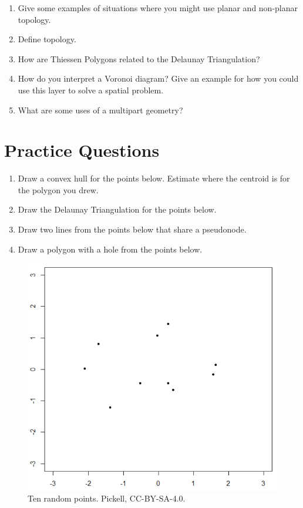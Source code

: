 \documentclass[
]{book}
\providecommand{\tightlist}{%
  \setlength{\itemsep}{0pt}\setlength{\parskip}{0pt}}
\begin{document}
\begin{enumerate}
\def\labelenumi{\arabic{enumi}.}
\tightlist
\item
  Give some examples of situations where you might use planar and non-planar topology.
\item
  Define topology.
\item
  How are Thiessen Polygons related to the Delaunay Triangulation?
\item
  How do you interpret a Voronoi diagram? Give an example for how you could use this layer to solve a spatial problem.
\item
  What are some uses of a multipart geometry?
\end{enumerate}

\section*{Practice Questions}\label{practice-questions-2}

\begin{enumerate}
\def\labelenumi{\arabic{enumi}.}
\tightlist
\item
  Draw a convex hull for the points below. Estimate where the centroid is for the polygon you drew.
\item
  Draw the Delaunay Triangulation for the points below.
\item
  Draw two lines from the points below that share a pseudonode.
\item
  Draw a polygon with a hole from the points below.
\end{enumerate}

\begin{figure}
\includegraphics[width=0.75\linewidth]{images/07-scatterplot} \caption{Ten random points. Pickell, CC-BY-SA-4.0.}\label{fig:7-scatterplot}
\end{figure}
\end{document}
